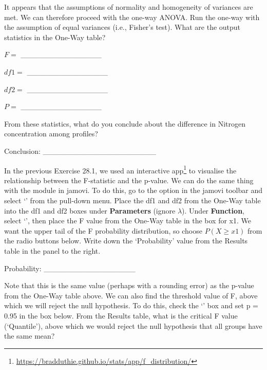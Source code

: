 \documentclass[
  openany]{krantz}
\renewcommand{\href}[2]{#2\footnote{\url{#1}}}
\begin{document}
It appears that the assumptions of normality and homogeneity of variances are met.
We can therefore proceed with the one-way ANOVA.
Run the one-way  with the assumption of equal variances (i.e., Fisher's test).
What are the output statistics in the One-Way  table?

\(F =\) \_\_\_\_\_\_\_\_\_\_\_\_\_\_\_

\(df1 =\) \_\_\_\_\_\_\_\_\_\_\_\_\_\_\_

\(df2 =\) \_\_\_\_\_\_\_\_\_\_\_\_\_\_\_

\(P =\) \_\_\_\_\_\_\_\_\_\_\_\_\_\_\_

From these statistics, what do you conclude about the difference in Nitrogen concentration among profiles?

Conclusion: \_\_\_\_\_\_\_\_\_\_\_\_\_\_\_\_\_\_\_\_\_

\newpage

In the previous Exercise 28.1, we used an \href{https://bradduthie.github.io/stats/app/f_distribution/}{interactive app} to visualise the relationship between the F-statistic and the p-value.
We can do the same thing with the  module in jamovi.
To do this, go to the  option in the jamovi toolbar and select `' from the pull-down menu.
Place the df1 and df2 from the One-Way  table into the df1 and df2 boxes under \textbf{Parameters} (ignore \(\lambda\)).
Under \textbf{Function}, select `', then place the F value from the One-Way  table in the box for x1.
We want the upper tail of the F probability distribution, so choose \(P(X \geq x1)\) from the radio buttons below.
Write down the `Probability' value from the Results table in the panel to the right.

Probability: \_\_\_\_\_\_\_\_\_\_\_\_\_\_\_\_\_

Note that this is the same value (perhaps with a rounding error) as the p-value from the One-Way  table above.
We can also find the threshold value of F, above which we will reject the null hypothesis.
To do this, check the `' box and set p = 0.95 in the box below.
From the Results table, what is the critical F value (`Quantile'), above which we would reject the null hypothesis that all groups have the same mean?
\end{document}
